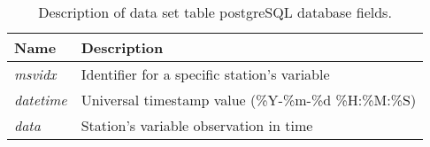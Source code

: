 \begin{table}[h]
    \caption{Description of data set table postgreSQL database fields.}
    \label{tab:dataset}
    \centering
    \begin{tabular}{l l}
        \hline
        \bf{Name} & \bf{Description}\\
        \hline
        \emph{msvidx} & Identifier for a specific station's variable\\
        
        \emph{datetime} & Universal timestamp value (\%Y-\%m-\%d \%H:\%M:\%S)\\
        
        \emph{data} & Station's variable observation in time\\
        \hline
    \end{tabular}
\end{table}

